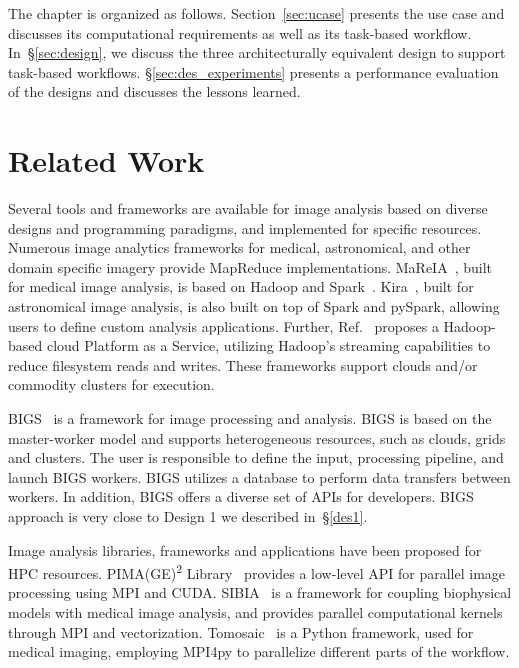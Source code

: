 The chapter is organized as follows. Section~\ref{sec:ucase} presents the use
case and discusses its computational requirements as well as its task-based
workflow. In~\S\ref{sec:design}, we discuss the three architecturally
equivalent design to support task-based workflows. \S\ref{sec:des_experiments}
presents a performance evaluation of the designs and discusses the lessons
learned.

\section{Related Work}

Several tools and frameworks are available for image analysis based on diverse
designs and programming paradigms, and implemented for specific resources.
Numerous image analytics frameworks for medical, astronomical, and other
domain specific imagery provide MapReduce implementations.
MaReIA~\cite{vo2018mareia}, built for medical image analysis, is based on
Hadoop and Spark~\cite{zaharia2010spark}. Kira~\cite{zhang2016kira}, built for
astronomical image analysis, is also built on top of Spark and pySpark,
allowing users to define custom analysis applications. Further,
Ref.~\cite{yan2014large} proposes a Hadoop-based cloud Platform as a Service,
utilizing Hadoop's streaming capabilities to reduce filesystem reads and
writes. These frameworks support clouds and/or commodity clusters for
execution.

BIGS~\cite{ramos2012bigs} is a framework for image processing and analysis.
BIGS is based on the master-worker model and supports heterogeneous resources,
such as clouds, grids and clusters. The user is responsible to define the
input, processing pipeline, and launch BIGS workers. BIGS utilizes a database
to perform data transfers between workers. In addition, BIGS offers a diverse
set of APIs for developers. BIGS approach is very close to Design 1 we
described in~\S\ref{des1}.

Image analysis libraries, frameworks and applications have been proposed for
HPC resources. PIMA(GE)\textsuperscript{2} Library~\cite{galizia2015mpicuda}
provides a low-level API for parallel image processing using MPI and CUDA.
SIBIA~\cite{gholami2017framework} is a framework for coupling biophysical
models with medical image analysis, and provides parallel computational
kernels through MPI and vectorization. Tomosaic~\cite{vescovi2018tomosaic} is
a Python framework, used for medical imaging, employing MPI4py to parallelize
different parts of the workflow.

